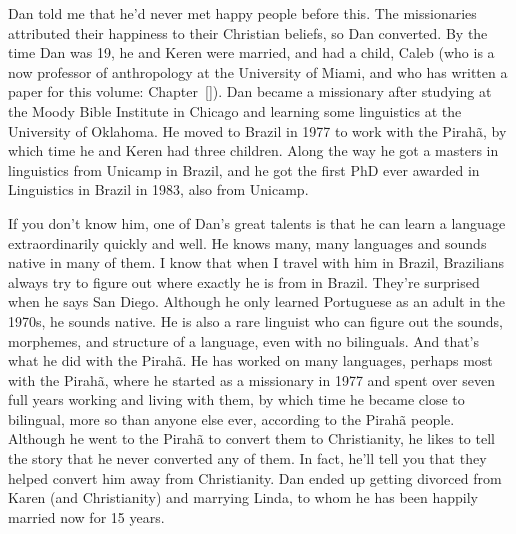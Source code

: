 \documentclass[output=paper,colorlinks,citecolor=brown
]{langscibook}
\begin{document}
Dan told me that he'd never met happy people before this. The missionaries attributed their happiness to their Christian beliefs, so Dan converted. By the time Dan was 19, he and Keren were married, and had a child, Caleb (who is a now professor of anthropology at the University of Miami, and who has written a paper for this volume: Chapter~\ref{}). Dan became a missionary after studying at the Moody Bible Institute in Chicago and learning some linguistics at the University of Oklahoma. He moved to Brazil in 1977 to work with the Pirahã, by which time he and Keren had three children. Along the way he got a masters in linguistics from Unicamp in Brazil, and he got the first PhD ever awarded in Linguistics in Brazil in 1983, also from Unicamp. 

If you don't know him, one of Dan's great talents is that he can learn a language extraordinarily quickly and well. He knows many, many languages and sounds native in many of them. I know that when I travel with him in Brazil, Brazilians always try to figure out where exactly he is from in Brazil. They're surprised when he says San Diego. Although he only learned Portuguese as an adult in the 1970s, he sounds native. He is also a rare linguist who can figure out the sounds, morphemes, and structure of a language, even with no bilinguals. And that's what he did with the Pirahã. He has worked on many languages, perhaps most with the Pirahã, where he started as a missionary in 1977 and spent over seven full years working and living with them, by which time he became close to bilingual, more so than anyone else ever, according to the Pirahã people. Although he went to the Pirahã to convert them to Christianity, he likes to tell the story that he never converted any of them. In fact, he'll tell you that they helped convert him away from Christianity. Dan ended up getting divorced from Karen (and Christianity) and marrying Linda, to whom he has been happily married now for 15 years. 
\end{document}
